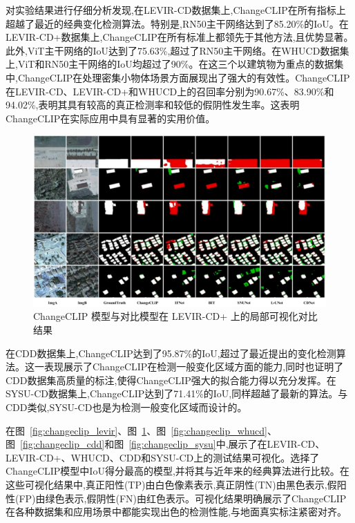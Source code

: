 对实验结果进行仔细分析发现,在LEVIR-CD数据集上,ChangeCLIP在所有指标上超越了最近的经典变化检测算法。特别是,RN50主干网络达到了85.20\%的IoU。在LEVIR-CD+数据集上,ChangeCLIP在所有标准上都领先于其他方法,且优势显著。此外,ViT主干网络的IoU达到了75.63\%,超过了RN50主干网络。在WHUCD数据集上,ViT和RN50主干网络的IoU均超过了90\%。在这三个以建筑物为重点的数据集中,ChangeCLIP在处理密集小物体场景方面展现出了强大的有效性。ChangeCLIP在LEVIR-CD、LEVIR-CD+和WHUCD上的召回率分别为90.67\%、83.90\%和94.02\%,表明其具有较高的真正检测率和较低的假阴性发生率。这表明ChangeCLIP在实际应用中具有显著的实用价值。

\begin{figure}[!htbp]
  \centering
  \includegraphics[width=\textwidth]{paper_figures/基于AI基础模型微调的变化检测模型研究/ChangeCLIP/changeclip_levirplus.png}
  \caption{ChangeCLIP 模型与对比模型在 LEVIR-CD+ 上的局部可视化对比结果}
  \label{fig:changeclip_levirplus}
\end{figure}

在CDD数据集上,ChangeCLIP达到了95.87\%的IoU,超过了最近提出的变化检测算法。这一表现展示了ChangeCLIP在检测一般变化区域方面的能力,同时也证明了CDD数据集高质量的标注,使得ChangeCLIP强大的拟合能力得以充分发挥。在SYSU-CD数据集上,ChangeCLIP达到了71.41\%的IoU,同样超越了最新的算法。与CDD类似,SYSU-CD也是为检测一般变化区域而设计的。

在图~\ref{fig:changeclip_levir}、图~\ref{fig:changeclip_levirplus}、图~\ref{fig:changeclip_whucd}、图~\ref{fig:changeclip_cdd}和图~\ref{fig:changeclip_sysu}中,展示了在LEVIR-CD、LEVIR-CD+、WHUCD、CDD和SYSU-CD上的测试结果可视化。选择了ChangeCLIP模型中IoU得分最高的模型,并将其与近年来的经典算法进行比较。在这些可视化结果中,真正阳性(TP)由白色像素表示,真正阴性(TN)由黑色表示,假阳性(FP)由绿色表示,假阴性(FN)由红色表示。可视化结果明确展示了ChangeCLIP在各种数据集和应用场景中都能实现出色的检测性能,与地面真实标注紧密对齐。

